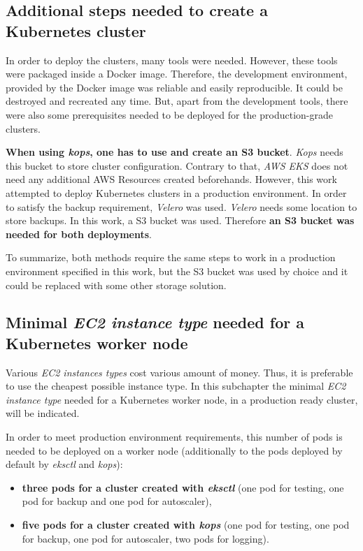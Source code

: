 \subsection{Additional steps needed to create a Kubernetes cluster}
In order to deploy the clusters, many tools were needed. However, these tools were packaged inside a Docker image. Therefore, the development environment, provided by the Docker image was reliable and easily reproducible. It could be destroyed and recreated any time. But, apart from the development tools, there were also some prerequisites needed to be deployed for the production-grade clusters.

\textbf{When using \textit{kops}, one has to use and create an S3 bucket}. \textit{Kops} needs this bucket to store cluster configuration. Contrary to that, \textit{AWS EKS} does not need any additional AWS Resources created beforehands. However, this work attempted to deploy Kubernetes clusters in a production environment. In order to satisfy the backup requirement, \textit{Velero} was used. \textit{Velero} needs some location to store backups. In this work, a S3 bucket was used. Therefore \textbf{an S3 bucket was needed for both deployments}.

To summarize, both methods require the same steps to work in a production environment specified in this work, but the S3 bucket was used by choice and it could be replaced with some other storage solution.

\subsection{Minimal \textit{EC2 instance type} needed for a Kubernetes worker node}
Various \textit{EC2 instances types} cost various amount of money. Thus, it is preferable to use the cheapest possible instance type. In this subchapter the minimal \textit{EC2 instance type}  needed for a Kubernetes worker node, in a production ready cluster, will be indicated.

In order to meet production environment requirements, this number of pods is needed to be deployed on a worker node (additionally to the pods deployed by default by \textit{eksctl} and \textit{kops}):
\begin{itemize}
\item \textbf{three pods for a cluster created with \textit{eksctl}} (one pod for testing, one pod for backup and one pod for autoscaler),
\item \textbf{five pods for a cluster created with \textit{kops}} (one pod for testing, one pod for backup, one pod for autoscaler, two pods for logging).
\end{itemize}

